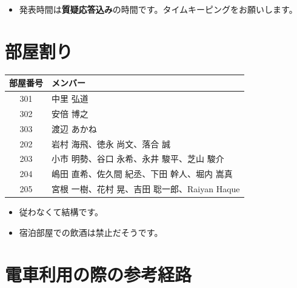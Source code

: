 \documentclass[unicode,a4paper,11pt]{ltjsarticle}
\begin{document}
\begin{itemize}
      \item
            発表時間は\textbf{質疑応答込み}の時間です。タイムキーピングをお願いします。
\end{itemize}

\section{部屋割り}

\begin{center}
      \begin{tabular}{cl}\hline
            部屋番号 & メンバー                                      \\ \hline
            301      & 中里 弘道                                     \\
            302      & 安倍 博之                                     \\
            303      & 渡辺 あかね                                   \\
            202      & 岩村 海飛、徳永 尚文、落合 誠                 \\
            203      & 小市 明勢、谷口 永希、永井 駿平、芝山 駿介    \\
            204      & 嶋田 直希、佐久間 紀丞、下田 幹人、堀内 嵩真  \\
            205      & 宮根 一樹、花村 晃、吉田 聡一郎、Raiyan Haque \\ \hline
      \end{tabular}
\end{center}

\begin{itemize}
      \item
            従わなくて結構です。
      \item
            宿泊部屋での飲酒は禁止だそうです。
\end{itemize}


\section{電車利用の際の参考経路}

\vspace*{5pt}
\end{document}
